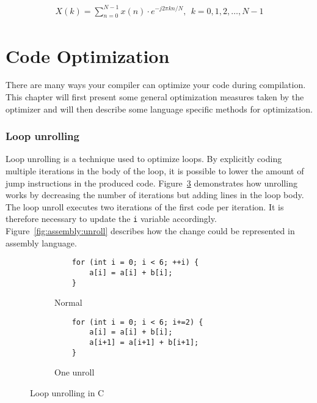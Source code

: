 \begin{align}
    X\left(k\right) = \sum\limits_{n=0}^{N-1}x\left(n\right)\cdot e^{-j2\pi kn/N},\ \ k = 0,1,2,\dots,N-1\label{eq:1}
\end{align}

\section{Code Optimization}

There are many ways your compiler can optimize your code during compilation. This chapter will first present some general optimization measures taken by the optimizer and will then describe some language specific methods for optimization.

\subsubsection{Loop unrolling}
Loop unrolling is a technique used to optimize loops. By explicitly coding multiple iterations in the body of the loop, it is possible to lower the amount of jump instructions in the produced code. Figure~\ref{fig:c:unroll} demonstrates how unrolling works by decreasing the number of iterations but adding lines in the loop body. The loop unroll executes two iterations of the first code per iteration. It is therefore necessary to update the \texttt{i} variable accordingly. Figure~\ref{fig:assembly:unroll} describes how the change could be represented in assembly language.

\begin{figure}[H]
    \centering
    \begin{subfigure}{.5\textwidth}
        \centering
        \begin{verbatim}
    for (int i = 0; i < 6; ++i) {
        a[i] = a[i] + b[i];
    }

        \end{verbatim}
        \caption{Normal}
        \label{fig:c:unroll:normal}
    \end{subfigure}%
    \begin{subfigure}{.5\textwidth}
        \centering
        \begin{verbatim}
    for (int i = 0; i < 6; i+=2) {
        a[i] = a[i] + b[i];
        a[i+1] = a[i+1] + b[i+1];
    }
        \end{verbatim}
        \caption{One unroll}
        \label{fig:c:unroll:unroll}
    \end{subfigure}
    \caption{Loop unrolling in C}
    \label{fig:c:unroll}
\end{figure}

